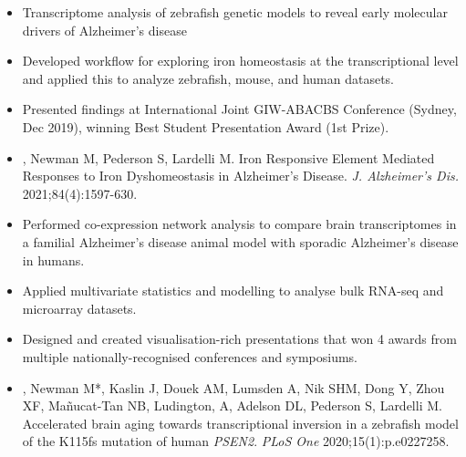 \documentclass[10pt,a4paper,ragged2e,withhyper]{altacv2}
\begin{document}
\begin{paracol}{2}
\begin{itemize}
  \item {} Transcriptome analysis of zebrafish genetic models to reveal early molecular drivers of Alzheimer's disease
\end{itemize}

\medskip
{}
\begin{itemize}
\item Developed workflow for exploring iron homeostasis at the transcriptional level and applied this to analyze zebrafish, mouse, and human datasets.
\item Presented findings at International Joint GIW-ABACBS Conference (Sydney, Dec 2019), winning Best Student Presentation Award (1st Prize). 
\item {}, Newman M, Pederson S, Lardelli M. Iron Responsive Element Mediated Responses to Iron Dyshomeostasis in Alzheimer’s Disease. \textit{J. Alzheimer's Dis.} 2021;84(4):1597-630.
\end{itemize}

\begin{itemize}
\item Performed co-expression network analysis to compare brain transcriptomes in a familial Alzheimer's disease animal model with sporadic Alzheimer's disease in humans.
\item Applied multivariate statistics and modelling to analyse bulk RNA-seq and microarray datasets. 
\item Designed and created visualisation-rich presentations that won 4 awards from multiple nationally-recognised conferences and symposiums.
\item {}, Newman M*, Kaslin J, Douek AM, Lumsden A, Nik SHM, Dong Y, Zhou XF, Mañucat-Tan NB, Ludington, A, Adelson DL, Pederson S, Lardelli M. Accelerated brain aging towards transcriptional inversion in a zebrafish model of the K115fs mutation of human \textit{PSEN2}. \textit{PLoS One} 2020;15(1):p.e0227258. 
\end{itemize}


\end{paracol}
\end{document}
